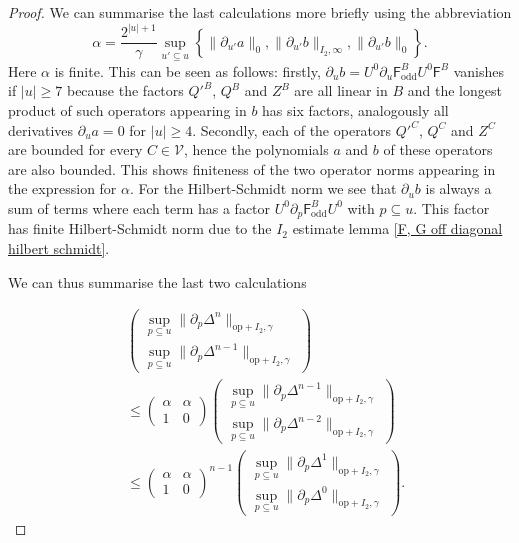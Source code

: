 \documentclass[b5paper,draft,openbib,12pt]{memoir}
\DeclareMathOperator{\odd}{odd}
\begin{document}
\begin{proof}
We can summarise the last calculations more briefly
using the abbreviation
\begin{equation}
\alpha=\frac{2^{|u|+1}}{\gamma} \sup_{u'\subseteq u}
\left\{\|\partial_{u'}a\|_{0},
\|\partial_{u'}b\|_{I_2,\infty},
\|\partial_{u'}b\|_{0}  \right\}.
\end{equation}
Here \(\alpha\) is finite. This can be seen as follows:
firstly, \(\partial_u b=U^0 \partial_u \mathsf{F}^B_{\odd}U^0 \mathsf{F}^B\) 
vanishes if \(|u|\ge 7\) because the factors 
\({Q'}^B\), \(Q^B\) and \(Z^B\) are all linear in 
\(B\) and the longest product of such operators 
appearing in \(b\) has six factors, analogously 
all derivatives \(\partial_u a=0\) for \(|u|\ge 4\).
Secondly, each of the operators  \({Q'}^C\), \(Q^C\) 
and \(Z^C\) are bounded for every \(C\in\mathcal{V}\),
hence the polynomials \(a\) and \(b\) of these 
operators are also bounded. This shows finiteness 
of the two operator norms appearing in the expression 
for \(\alpha\). For the Hilbert-Schmidt norm we 
  see 
that \(\partial_u b\) is always a sum of terms 
where each term has a factor 
\(U^0 \partial_p \mathsf{F}_{\odd}^B U^0\) with \(p\subseteq u\).
This factor has finite Hilbert-Schmidt norm due to 
the \(I_2\) estimate lemma 
\ref{F, G off diagonal hilbert schmidt}.

We can thus summarise the last two calculations 

\begin{align}
&\begin{pmatrix} \sup_{p\subseteq u} \|\partial_p \Delta^{n} \|_{\mathrm{op}+I_2,\gamma}\\
\sup_{p\subseteq u} \|\partial_p \Delta^{n-1}\|_{\mathrm{op}+I_2,\gamma}\end{pmatrix}\\
&\le\begin{pmatrix}\alpha & \alpha \\ 1 & 0 \end{pmatrix}
\begin{pmatrix} \sup_{p\subseteq u} \|\partial_p \Delta^{n-1}\|_{\mathrm{op}+I_2,\gamma}\\
\sup_{p\subseteq u} \|\partial_p \Delta^{n-2}\|_{\mathrm{op}+I_2,\gamma} \end{pmatrix}\\\label{analyticity converging recursion}
&\le\begin{pmatrix}\alpha & \alpha \\ 1 & 0 \end{pmatrix}^{n-1}
  \begin{pmatrix} \sup_{p\subseteq u} \|\partial_p \Delta^{1}\|_{\mathrm{op}+I_2,\gamma}\\
  \sup_{p\subseteq u} \|\partial_p \Delta^{0}\|_{\mathrm{op}+I_2,\gamma} \end{pmatrix}.
\end{align}


\end{proof}
\end{document}
